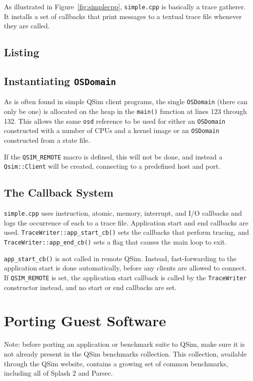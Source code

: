 \documentclass[letterpaper, 10pt]{book}
\begin{document}
As illustrated in Figure~\ref{fig:simplecpp}, \texttt{simple.cpp} is basically a
trace gatherer. It installs a set of callbacks that print messages to a textual
trace file whenever they are called.

\section{Listing}


\section{Instantiating \texttt{OSDomain}}
As is often found in simple QSim client programs, the single \texttt{OSDomain}
(there can only be one) is allocated on the heap in the \texttt{main()}
function at lines 123 through 132. This allows the same \texttt{osd} reference
to be used for either an \texttt{OSDomain} constructed with a number of CPUs and
a kernel image or an \texttt{OSDomain} constructed from a state file.

If the \texttt{QSIM\_REMOTE} macro is defined, this will not be done, and
instead a \texttt{Qsim::Client} will be created, connecting to a predefined
host and port.

\section{The Callback System}

\texttt{simple.cpp} uses instruction, atomic, memory, interrupt, and I/O
callbacks and logs the occurrence of each to a trace file. Application start
and end callbacks are used. \texttt{TraceWriter::app\_start\_cb()} sets the
callbacks that perform tracing, and \texttt{TraceWriter::app\_end\_cb()}
sets a flag that causes the main loop to exit.

\texttt{app\_start\_cb()} is not called in remote QSim. Instead, fast-forwarding
to the application start is done automatically, before any clients are allowed
to connect. If \texttt{QSIM\_REMOTE} is set, the application start callback is
called by the \texttt{TraceWriter} constructor instead, and no start or end
callbacks are set.

\chapter{Porting Guest Software} \label{chap:porting}
Note: before porting an application or benchmark suite to QSim, make sure it is 
not already present in the QSim benchmarks collection. This collection,
available through the QSim website, contains a growing set of common benchmarks,
including all of Splash 2 and Parsec.
\end{document}
